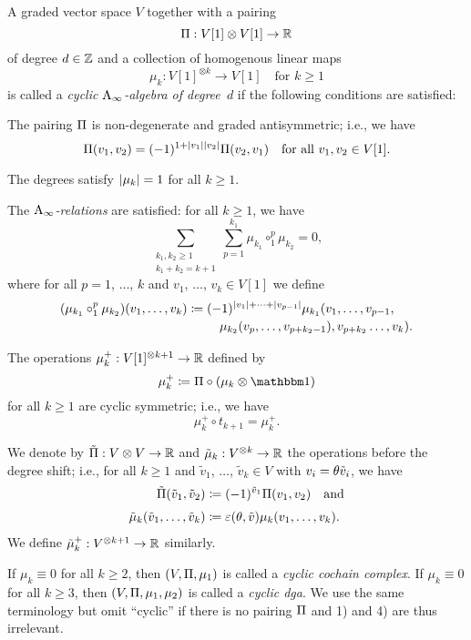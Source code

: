 \documentclass[\MainFolder/Text.tex]{subfiles}
\begin{document}
\begin{Def} \label{Def:CyclicAinfty}
A graded vector space $V$ together with a pairing 
$$ \Pi: V[1]\otimes V[1] \rightarrow \mathbb{R} $$
of degree $d\in \mathbb{Z}$ and a collection of homogenous linear maps 
$$\mu_k: V[1]^{\otimes k} \rightarrow V[1]\quad\text{for }k\ge 1$$
is called a \emph{cyclic $\mathrm{A}_\infty$-algebra of degree~$d$} if the following conditions are satisfied:
\begin{PlainList}
 \item The pairing $\Pi$ is non-degenerate and graded antisymmetric; i.e., we have
  $$ \Pi(v_1,v_2) = (-1)^{1+|v_1||v_2|} \Pi(v_2,v_1) \quad\text{for all }v_1, v_2 \in V[1]. $$
 \item The degrees satisfy $|\mu_k|=1$ for all $k\ge 1$.
 \item The \emph{$\mathrm{A}_\infty$-relations} are satisfied: for all $k\ge 1$, we have
\begin{equation} \label{Eq:AInftyDef}
 \sum_{\substack{k_1, k_2 \ge 1 \\ k_1+k_2 = k+1}} \sum_{p=1}^{k_1} \mu_{k_1} \circ_1^p \mu_{k_2} = 0,
 \end{equation}
where for all $p=1$, $\dotsc$, $k$ and $v_1$, $\dotsc$, $v_{k}\in V[1]$ we define
$$(\mu_{k_1} \circ_1^p \mu_{k_2})(v_1, \dotsc, v_{k}) \coloneqq \begin{multlined}[t] (-1)^{\Abs{v_1} + \dotsb + \Abs{v_{p-1}}} \mu_{k_1}(v_1, \dotsc, v_{p-1},\\ \mu_{k_2}(v_p,\dotsc,v_{p+k_2-1}),v_{p+k_2}\dotsc,v_{k}). \end{multlined}$$

 \item The operations $\mu_k^+: V[1]^{\otimes k+1} \rightarrow \mathbb{R}$ defined by 
 $$ \mu_k^+\coloneqq \Pair\circ (\mu_k \otimes \Id) $$
 for all $k\ge 1$ are cyclic symmetric; i.e., we have
 $$ \mu_k^+ \circ t_{k+1} = \mu_k^+. $$
\end{PlainList}
We denote by $\tilde{\Pi}: V\otimes V \rightarrow \mathbb{R}$ and $\tilde{\mu}_k: V^{\otimes k} \rightarrow \mathbb{R}$ the operations before the degree shift; i.e., for all $k\ge 1$ and $\tilde{v}_1$, $\dotsc$, $\tilde{v}_k \in V$ with $v_i = \theta \tilde{v}_i$, we have
\begin{align*}
\tilde{\Pi}(\tilde{v}_1, \tilde{v}_2) &\coloneqq (-1)^{\tilde{v}_1} \Pi(v_1, v_2)\quad\text{and} \\[\jot]
\tilde{\mu}_k(\tilde{v}_1, \dotsc, \tilde{v}_k) &\coloneqq \varepsilon(\theta,\tilde{v}) \mu_k(v_1,\dotsc, v_k).
\end{align*}
We define $\tilde{\mu}_k^+: V^{\otimes k+1}\rightarrow \mathbb{R}$ similarly.

If $\mu_k \equiv 0$ for all $k\ge 2$, then $(V,\Pi, \mu_1)$ is called a \emph{cyclic cochain complex}. If $\mu_k \equiv 0$ for all $k\ge 3$, then $(V,\Pi,\mu_1,\mu_2)$ is called a \emph{cyclic dga}. We use the same terminology but omit ``cyclic'' if there is no pairing $\Pi$ and 1) and 4) are thus irrelevant.
\end{Def}
\end{document}
